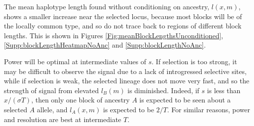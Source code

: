 \documentclass[11pt,letterpaper]{article}
\begin{document}
The mean haplotype length found without conditioning on ancestry, $l(x,m)$,
shows a smaller increase near the selected locus, because most blocks will be of the locally common type, and so do not trace back to regions of different block lengths.
This is shown in Figures \ref{Fig:meanBlockLengthsUnconditioned}, \ref{Supp:blockLengthHeatmapNoAnc} and \ref{Supp:blockLengthNoAnc}.

Power will be optimal at intermediate values of $s$.
If selection is too strong, it may be difficult to observe the signal
due to a lack of introgressed selective sites,
while if selection is weak, the selected lineage does not move very fast,
and so the strength of signal from elevated $l_B(m)$ is diminished. 
Indeed, if $s$ is less than $x/(\sigma T)$, then only one block of ancestry $A$ is expected to be seen about a selected $A$ allele,
and $l_A(x,m)$ is expected to be $2/T$.
For similar reasons, power and resolution are best at intermediate $T$.

\end{document}
